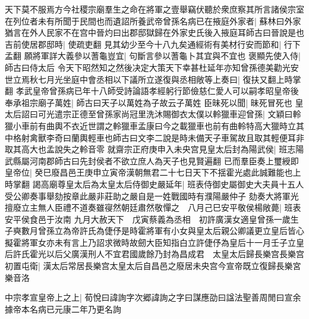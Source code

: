 天下莫不服焉方今社稷宗廟羣生之命在將軍之壹舉竊伏聽於衆庶察其所言諸侯宗室在列位者未有所聞于民間也而遺詔所養武帝曾孫名病已在掖庭外家者|{
	蘇林曰外家猶言在外人民家不在宫中晉灼曰出郡邸獄歸在外家史氏後入掖庭耳師古曰晉說是也}
吉前使居郡邸時|{
	使疏吏翻}
見其幼少至今十八九矣通經術有美材行安而節和|{
	行下孟翻}
願將軍詳大義參以蓍龜豈宜|{
	句斷言參以蓍龜卜其宜與不宜也}
褒顯先使入侍|{
	師古曰侍太后}
令天下昭然知之然後决定大策天下幸甚杜延年亦知曾孫德美勸光安世立焉秋七月光坐庭中會丞相以下議所立遂復與丞相敞等上奏曰|{
	復扶又翻上時掌翻}
孝武皇帝曾孫病已年十八師受詩論語孝經躬行節儉慈仁愛人可以嗣孝昭皇帝後奉承祖宗廟子萬姓|{
	師古曰天子以萬姓為子故云子萬姓}
臣昧死以聞|{
	昧死冒死也}
皇太后詔曰可光遣宗正德至曾孫家尚冠里洗沐賜御衣太僕以軨獵車迎曾孫|{
	文穎曰軨獵小車前有曲輿不衣近世謂之軨獵車孟康曰今之載獵車也前有曲軨特高大獵時立其中格射禽獸李奇曰蘭輿輕車也師古曰文李二說是時未備天子車駕故且取其輕便耳非取其高大也孟說失之軨音零}
就齋宗正府庚申入未央宫見皇太后封為陽武侯|{
	班志陽武縣屬河南郡師古曰先封侯者不欲立庶人為天子也見賢遍翻}
已而羣臣奏上璽綬即皇帝位|{
	癸巳廢昌邑王庚申立寅帝漢朝無君二十七日天下不揺霍光處此誠難能也上時掌翻}
謁高廟尊皇太后為太皇太后侍御史嚴延年|{
	班表侍御史屬御史大夫員十五人受公卿奏事舉劾按章此嚴非莊助之嚴自是一姓戰國時有濮陽嚴仲子}
劾奏大將軍光擅廢立主無人臣禮不道奏雖寑然朝廷肅然敬憚之　八月己巳安平敬侯楊敞薨|{
	班表安平侯食邑于汝南}
九月大赦天下　戊寅蔡義為丞相　初許廣漢女適皇曾孫一歲生子奭數月曾孫立為帝許氏為倢伃是時霍將軍有小女與皇太后親公卿議更立皇后皆心擬霍將軍女亦未有言上乃詔求微時故劒大臣知指白立許倢伃為皇后十一月壬子立皇后許氏霍光以后父廣漢刑人不宜君國歲餘乃封為昌成君　太皇太后歸長樂宫長樂宫初置屯衛|{
	漢太后常居長樂宫太皇太后自昌邑之廢居未央宫今宣帝既立復歸長樂宮樂音洛}


中宗孝宣皇帝上之上|{
	荀悅曰諱詢字次郷諱詢之字曰謀應劭曰諡法聖善周閒曰宣余據帝本名病已元康二年乃更名詢}



